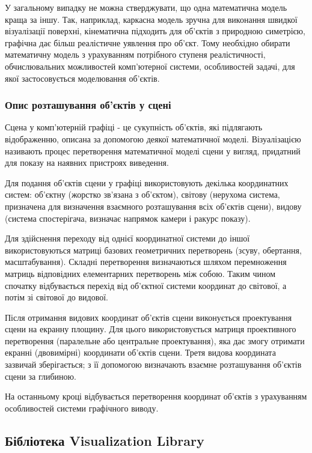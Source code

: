 \let\mypdfximage\pdfximage\def\pdfximage{\immediate\mypdfximage}\documentclass[14pt,a4paper]{extarticle}
\theoremstyle{definition}
\renewcommand{\[}{\begin{singlespace}\begin{equation*}}
\renewcommand{\]}{\end{equation*}\end{singlespace}}
\renewcommand{\+}{\discretionary{\mbox{\scriptsize$\hookleftarrow$}}{}{}}
\begin{document}
У загальному випадку не можна стверджувати, що одна математична модель краща за іншу. Так, наприклад, каркасна модель зручна для виконання швидкої візуалізації поверхні, кінематична підходить для  об'єктів з природною симетрією, графічна дає більш реалістичне уявлення про об'єкт.  Тому необхідно обирати математичну модель з урахуванням потрібного ступеня реалістичності, обчислювальних можливостей комп'ютерної системи, особливостей задачі, для якої застосовується моделювання об'єктів.

\subsubsection{Опис розташування об'єктів у сцені}

Сцена у комп'ютерній графіці - це сукупність об'єктів, які підлягають відображенню, описана за допомогою деякої математичної моделі. Візуалізацією називають процес перетворення математичної моделі сцени у вигляд, придатний для показу на наявних пристроях виведення.

Для подання об'єктів сцени у графіці використовують декілька координатних систем: об'єктну (жорстко зв'язана з об'єктом), світову (нерухома система, призначена для визначення взаємного розташування всіх об'єктів сцени), видову (система спостерігача, визначає напрямок камери і ракурс показу).

Для здійснення переходу від однієї координатної системи до іншої використовуються матриці базових геометричних перетворень (зсуву, обертання, масштабування). Складні перетворення визначаються шляхом перемноження матриць відповідних елементарних перетворень між собою. Таким чином спочатку відбувається перехід від об'єктної системи координат до світової, а потім зі світової до видової.

Після отримання видових координат об'єктів сцени виконується проектування сцени на екранну площину. Для цього використовується матриця проективного перетворення (паралельне або центральне проектування), яка дає змогу отримати екранні (двовимірні) координати об'єктів сцени. Третя видова координата зазвичай зберігається; з її допомогою визначають взаємне розташування об'єктів сцени за глибиною.

На останньому кроці відбувається перетворення координат об’єктів з урахуванням особливостей системи графічного виводу.

\subsection{Бібліотека Visualization Library}
\end{document}
